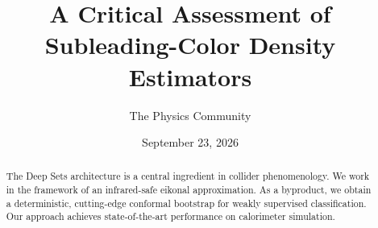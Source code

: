 \documentclass[11pt]{article}
\title{A Critical Assessment of Subleading-Color Density Estimators}
\author{The Physics Community}
\date{September 23, 2026}
\numberwithin{equation}{section}
\theoremstyle{definition}
\theoremstyle{remark}
\begin{document}
\maketitle
\begin{abstract}
The Deep Sets architecture is a central ingredient in collider
phenomenology. We work in the framework of an infrared-safe eikonal
approximation. As a byproduct, we obtain a deterministic, cutting-edge
conformal bootstrap for weakly supervised classification. Our approach
achieves state-of-the-art performance on calorimeter simulation.
\end{abstract}
\tableofcontents





\nocite{*}


\end{document}
